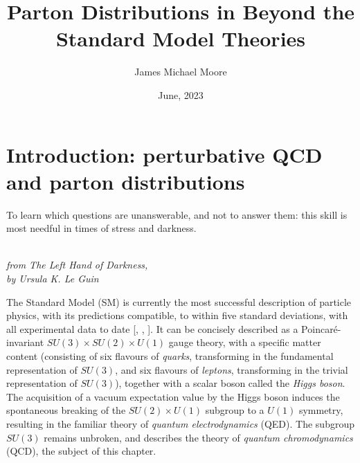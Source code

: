 \documentclass[withindex,glossary]{cam-thesis}
\title{Parton Distributions in Beyond the Standard Model Theories}
\author{James Michael Moore}
\date{June, 2023}
\begin{document}
\frontmatter{}



\chapter{Introduction: perturbative QCD and parton distributions}

\epigraph{To learn which questions are unanswerable, and not to answer them: this skill is most needful in times of stress and darkness.}{\textit{\\ from The Left Hand of Darkness, \\ by Ursula K. Le Guin}}

The Standard Model (SM) is currently the most successful description of particle physics, with its predictions compatible, to within five standard deviations, with all experimental data to date [, , ]. It can be concisely described as a Poincar\'{e}-invariant $SU(3) \times SU(2) \times U(1)$ gauge theory, with a specific matter content (consisting of six flavours of \textit{quarks}, transforming in the fundamental representation of $SU(3)$, and six flavours of \textit{leptons}, transforming in the trivial representation of $SU(3)$), together with a scalar boson called the \textit{Higgs boson}. The acquisition of a vacuum expectation value by the Higgs boson induces the spontaneous breaking of the $SU(2) \times U(1)$ subgroup to a $U(1)$ symmetry, resulting in the familiar theory of \textit{quantum electrodynamics} (QED). The subgroup $SU(3)$ remains unbroken, and describes the theory of \textit{quantum chromodynamics} (QCD), the subject of this chapter.
\end{document}
